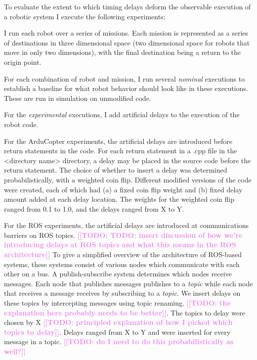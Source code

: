 \documentclass[conference]{IEEEtran}
\newcommand{\todo}[1]{\textcolor{violet}{{\bfseries [[TODO: #1]]}}}
\begin{document}
To evaluate the extent to which timing delays deform the observable execution of a robotic system I execute the following experiments:

I run each robot over a series of missions. Each mission is represented as a series of destinations in three dimensional space (two dimensional space for robots that move in only two dimensions), with the final destination being a return to the origin point.

For each combination of robot and mission, I run several \emph{nominal} executions to establish a baseline for what robot behavior should look like in these executions. These are run in simulation on unmodified code.

For the \emph{experimental} executions, I add artificial delays to the execution of the robot code.

For the ArduCopter experiments, the artificial delays are introduced before return statements in the code. For each return statement in a .cpp file in the <directory name> directory, a delay may be placed in the source code before the return statement. The choice of whether to insert a delay was determined probabilistically, with a weighted coin flip. Different modified versions of the code were created, each of which had (a) a fixed coin flip weight and (b) fixed delay amount added at each delay location. The weights for the weighted coin flip ranged from 0.1 to 1.0, and the delays ranged from X to Y.

For the ROS experiments, the artificial delays are introduced at communications barriers on ROS topics. \todo{TODO: insert discussion of how we're introducing delays at ROS topics and what this means in the ROS architecture}
To give a simplified overview of the architecture of ROS-based systems, these systems consist of various nodes which communicate with each other on a bus. A publish-subscribe system determines which nodes receive messages. Each node that publishes messages publishes to a \emph{topic} while each node that receives a message receives by subscribing to a \emph{topic}. We insert delays on these topics by intercepting messages using topic renaming. \todo{the explanation here probably needs to be better}. The topics to delay were chosen by X \todo{principled explanation of how I picked which topics to delay}. Delays ranged from X to Y and were inserted for every message in a topic. \todo{do I need to do this probabilistically as well?}
\end{document}
